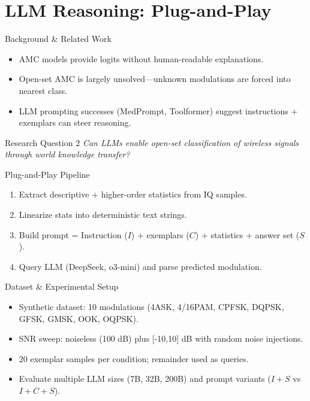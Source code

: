 \section{LLM Reasoning: Plug-and-Play}

\begin{frame}{Background \& Related Work}
    \begin{itemize}
        \item AMC models provide logits without human-readable explanations.
        \item Open-set AMC is largely unsolved—unknown modulations are forced into nearest class.
        \item LLM prompting successes (MedPrompt, Toolformer) suggest instructions + exemplars can steer reasoning.
    \end{itemize}
\end{frame}

\begin{frame}{Research Question 2}
    \centering
    \Large
    \textit{Can LLMs enable open-set classification of wireless signals through world knowledge transfer?}
\end{frame}

\begin{frame}{Plug-and-Play Pipeline}
    \begin{enumerate}
        \item Extract descriptive + higher-order statistics from IQ samples.
        \item Linearize stats into deterministic text strings.
        \item Build prompt = Instruction ($I$) + exemplars ($C$) + statistics + answer set ($S$).
        \item Query LLM (DeepSeek, o3-mini) and parse predicted modulation.
    \end{enumerate}
\end{frame}

\begin{frame}{Dataset \& Experimental Setup}
    \begin{itemize}
        \item Synthetic dataset: 10 modulations (4ASK, 4/16PAM, CPFSK, DQPSK, GFSK, GMSK, OOK, OQPSK).
        \item SNR sweep: noiseless (100 dB) plus [-10,10] dB with random noise injections.
        \item 20 exemplar samples per condition; remainder used as queries.
        \item Evaluate multiple LLM sizes (7B, 32B, 200B) and prompt variants ($I+S$ vs $I+C+S$).
    \end{itemize}
\end{frame}

